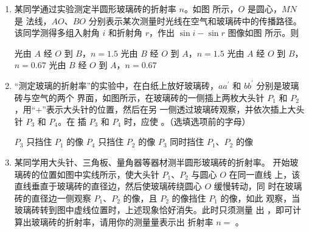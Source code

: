 
\begin{enumerate}
	\item
{}
某同学通过实验测定半圆形玻璃砖的折射率 $ n $。如图  所示，$ O $ 是圆心，$ MN $ 是
法线，$ AO $、$ BO $ 分别表示某次测量时光线在空气和玻璃砖中的传播路径。该同学测得多组入射角 $ i $
和折射角 $ r $，作出 $ \sin i- \sin r $ 图像如图  所示。则  
\begin{figure}[h!]
	\centering
\begin{subfigure}{0.4\linewidth}
	\centering
	 
	\caption{}\label{2016四川05a}
\end{subfigure}
\begin{subfigure}{0.4\linewidth}
	\centering
	 
	\caption{}\label{2016四川05b}
\end{subfigure}
\end{figure}

\fourchoices
{光由 $ A $ 经 $ O $ 到 $ B $，$ n=1.5 $}
{光由 $ B $ 经 $ O $ 到 $ A $，$ n=1.5 $}
{光由 $ A $ 经 $ O $ 到 $ B $，$ n=0.67 $}
{光由 $ B $ 经 $ O $ 到 $ A $，$ n=0.67 $}


\item 
{}
“测定玻璃的折射率”的实验中，在白纸上放好玻璃砖，$ aa ^{\prime} $ 和 $ bb ^{\prime} $ 分别是玻璃砖与空气的两个
界面，如图所示，在玻璃砖的一侧插上两枚大头针 $ P_{1} $ 和 $ P_{2} $，用“$ + $”表示大头针的位置，然后在另
一侧透过玻璃砖观察，并依次插上大头针 $ P_{3} $ 和 $ P_{4} $。在
插 $ P_{3} $ 和 $ P_{4} $ 时，应使 \underlinegap 。（选填选项前的字母）
\begin{figure}[h!]
	\centering
	
\end{figure}

\threechoices
{$ P_{3} $ 只挡住 $ P_{1} $ 的像}
{$ P_{4} $ 只挡住 $ P_{2} $ 的像}
{$ P_{3} $ 同时挡住 $ P_{1} $、$ P_{2} $ 的像}


\item 
{}
某同学用大头针、三角板、量角器等器材测半圆形玻璃砖的折射率。
开始玻璃砖的位置如图中实线所示，使大头针 $ P_{1} $、$ P_{2} $ 与圆心 $ O $ 在同一直线
上，该直线垂直于玻璃砖的直径边，然后使玻璃砖绕圆心 $ O $ 缓慢转动，同
时在玻璃砖的直径边一侧观察 $ P_{1} $、$ P_{2} $ 的像，且 $ P_{2} $ 的像挡住 $ P_{1} $ 的像，如此
观察，当玻璃砖转到图中虚线位置时，上述现象恰好消失。此时只须测量
出 \underlinegap ，即可计算出玻璃砖的折射率，请用你的测量量表示出
折射率 $ n= $ \underlinegap 。
\begin{figure}[h!]
	\centering
	
\end{figure}



\end{enumerate}
